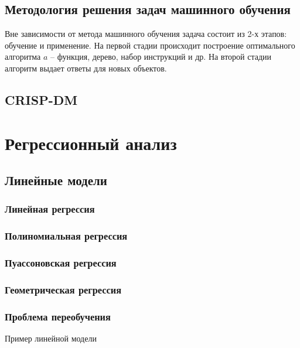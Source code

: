 \subsection{Методология решения задач машинного обучения}

Вне зависимости от метода машинного обучения задача состоит из 2-х этапов: обучение и применение.
На первой стадии происходит построение оптимального алгоритма $a$ -- функция, дерево, набор инструкций и др. На второй стадии алгоритм выдает ответы для новых объектов.



\subsection{CRISP-DM}



\section{Регрессионный анализ}


\subsection{Линейные модели}

\subsubsection{Линейная регрессия}

\subsubsection{Полиномиальная регрессия}

\subsubsection{Пуассоновская регрессия}

\subsubsection{Геометрическая регрессия}

\subsubsection{Проблема переобучения}

Пример линейной модели\\

